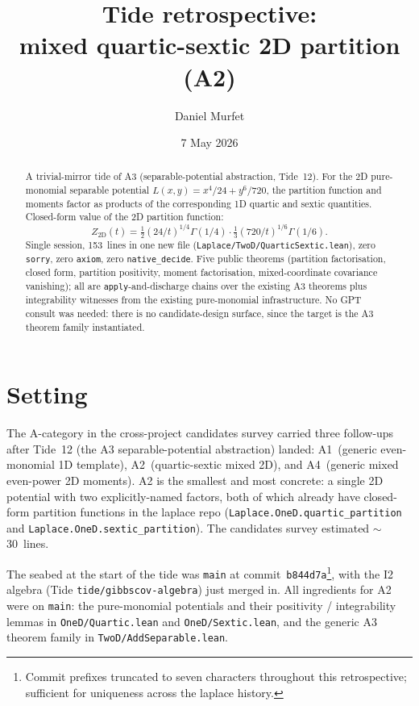 \documentclass[11pt]{article}
\title{Tide retrospective:\\mixed quartic-sextic 2D partition (A2)}
\author{Daniel Murfet}
\date{7 May 2026}
\begin{document}
\maketitle

\begin{abstract}
A trivial-mirror tide of A3 (separable-potential abstraction,
Tide~12). For the 2D pure-monomial separable potential
$L(x, y) = x^4/24 + y^6/720$, the partition function and moments
factor as products of the corresponding 1D quartic and sextic
quantities. Closed-form value of the 2D partition function:
$$
  Z_{\mathrm{2D}}(t) = \tfrac{1}{2}(24/t)^{1/4}\Gamma(1/4) \cdot
                       \tfrac{1}{3}(720/t)^{1/6}\Gamma(1/6).
$$
Single session, 153~lines in one new file
(\texttt{Laplace/TwoD/QuarticSextic.lean}), zero \texttt{sorry}, zero
\texttt{axiom}, zero \texttt{native\_decide}. Five public theorems
(partition factorisation, closed form, partition positivity, moment
factorisation, mixed-coordinate covariance vanishing); all are
\texttt{apply}-and-discharge chains over the existing A3 theorems
plus integrability witnesses from the existing pure-monomial
infrastructure. No GPT consult was needed: there is no
candidate-design surface, since the target is the A3 theorem family
instantiated.
\end{abstract}

\section{Setting}

The A-category in the cross-project candidates survey carried three
follow-ups after Tide~12 (the A3 separable-potential abstraction)
landed: A1~(generic even-monomial 1D template), A2~(quartic-sextic
mixed 2D), and A4~(generic mixed even-power 2D moments). A2 is the
smallest and most concrete: a single 2D potential with two
explicitly-named factors, both of which already have closed-form
partition functions in the laplace repo
(\texttt{Laplace.OneD.quartic\_partition} and
\texttt{Laplace.OneD.sextic\_partition}). The candidates survey
estimated $\sim$30~lines.

The seabed at the start of the tide was \texttt{main} at
commit~\texttt{b844d7a}\footnote{Commit prefixes truncated to seven
characters throughout this retrospective; sufficient for uniqueness
across the laplace history.}, with the I2 algebra (Tide
\texttt{tide/gibbscov-algebra}) just merged in. All ingredients for
A2 were on \texttt{main}: the pure-monomial potentials and their
positivity / integrability lemmas in
\texttt{OneD/Quartic.lean} and \texttt{OneD/Sextic.lean}, and the
generic A3 theorem family in \texttt{TwoD/AddSeparable.lean}.
\end{document}
